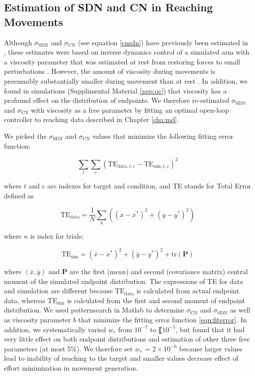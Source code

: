 \subsection{Estimation of SDN and CN in Reaching Movements}
Although $\sigma_{\text{SDN}}$ and $\sigma_{\text{CN}}$ (see equation \ref{cnsdn}) have previously been estimated in \cite{VanBeers2004}, these estimates were based on inverse dynamics control of a simulated arm with a viscosity parameter that was estimated at rest from restoring forces to small perturbations \cite{Gomi1998}. 
However, the amount of viscosity during movements is presumably substantially smaller during movement than at rest \cite{Burdet2013}. 
In addition, we found in simulations (Supplimental Material \ref{app:oc}) that viscosity has a profound effect on the distribution of endpoints.  
We therefore re-estimated $\sigma_{\text{SDN}}$ and $\sigma_{\text{CN}}$ with viscosity as a free parameter by fitting an optimal open-loop controller to reaching data described in Chapter \ref{cha:md}.

We picked the $\sigma_{\text{SDN}}$ and $\sigma_{\text{CN}}$ values that minimize the following fitting error function:

\begin{equation}
\label{eqn:fiterror}
\sum_{t}\sum_{c} (\text{TE}_{\text{data},t,c} - \text{TE}_{\text{sim},t,c})^2
\end{equation}

where $t$ and $c$ are indexes for target and condition, and TE stands for Total Error defined as 

\begin{equation}
\text{TE}_{\text{data}} = \frac1N\sum_n \left( (x - x^*)^2 + (y - y^*)^2 \right) 
\end{equation}

where $n$ is index for trials;

\begin{equation}
\text{TE}_{\text{sim}} = (\bar{x} - x^*)^2 + (\bar{y} - y^*)^2 + \text{tr}(\bm{P})
\end{equation}

where $(\bar{x},\bar{y})$ and $\bm{P}$ are the first (mean) and second (covariance matrix) central moment of the simulated endpoint distribution. 
The expressions of TE for data and simulation are different because $\text{TE}_{\text{data}}$ is calculated from actual endpoint data, whereas $\text{TE}_{\text{sim}}$ is calculated from the first and second moment of endpoint distribution.
We used \textsf{patternsearch} in Matlab to determine $\sigma_{\text{CN}}$ and $\sigma_{\text{SDN}}$ as well as viscosity parameter $ b $ that minimize the fitting error function \ref{eqn:fiterror}. 
In addition, we systematically varied $ w_r $ from $ 10^{-7} $ to 〖$ 10^{-5} $, but found that it had very little effect on both endpoint distributions and estimation of other three free parameters (at most 5\%). We therefore set $ w_r $ = $ 2\times 10^{-6} $ because larger values lead to inability of reaching to the target and smaller values decrease effect of effort minimization in movement generation. 
		
